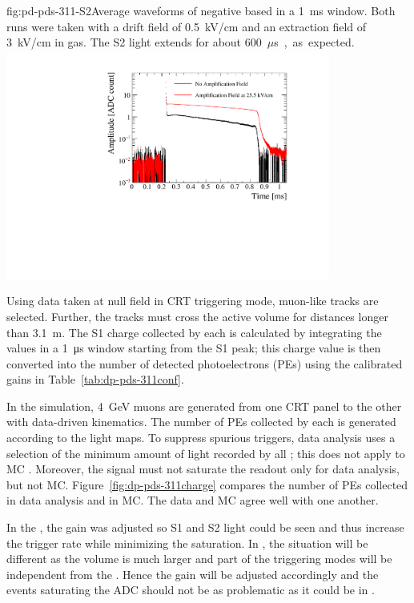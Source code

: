 \begin{dunefigure}{fig:pd-pds-311-S2}{Average waveforms of negative based  in a \SI{1}{ms} window. Both runs were taken with a drift field of \SI{0.5}{kV/cm} and an extraction field of \SI{3}{kV/cm} in gas. The S2 light extends for about \SI{600}{$\mu$s}, as expected.}
\includegraphics[width=0.8\textwidth]{graphics/dppd_311_S2_extraction.pdf}
\end{dunefigure}
Using data taken at null field in CRT triggering mode, muon-like tracks are selected. Further, the tracks must cross the active volume for distances longer than \SI{3.1}{\m}. 
The S1 charge collected by each  is calculated by integrating the  values in a \SI{1}{\us} window starting from the S1 peak; this charge value is then converted into the number of detected photoelectrons (PEs)  using the calibrated  gains in Table~\ref{tab:dp-pds-311conf}.

In the simulation, \SI{4}{\GeV} muons are generated from one CRT panel to the other with data-driven kinematics. The number of PEs collected by each  is generated according to the light maps. To suppress spurious triggers, data analysis uses a selection of the minimum amount of light recorded by all ; this does not apply to MC . Moreover, the  signal must not saturate the readout only for data analysis, but not MC. Figure~\ref{fig:dp-pds-311charge} compares the number of PEs collected in data analysis and in MC. The data and MC agree well with one another. 

In the , the  gain was adjusted so S1 and S2 light could be seen and thus increase the trigger rate while minimizing the   saturation. 
In \dune \dual, the situation will be different as the volume is much larger and part of the triggering modes will be independent from the . 
Hence the  gain will be adjusted accordingly and the events saturating the ADC should not be as problematic as it could be in .

